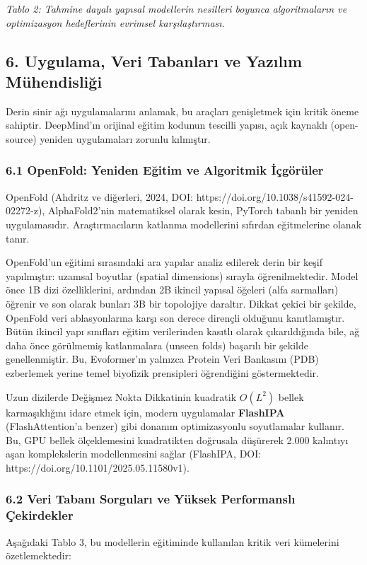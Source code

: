 \documentclass[11pt,a4paper]{article}
\begin{document}
\textit{Tablo 2: Tahmine dayalı yapısal modellerin nesilleri boyunca algoritmaların ve optimizasyon hedeflerinin evrimsel karşılaştırması.}

\subsection{6. Uygulama, Veri Tabanları ve Yazılım Mühendisliği}
Derin sinir ağı uygulamalarını anlamak, bu araçları genişletmek için kritik öneme sahiptir. DeepMind'ın orijinal eğitim kodunun tescilli yapısı, açık kaynaklı (open-source) yeniden uygulamaları zorunlu kılmıştır.

\subsubsection{6.1 OpenFold: Yeniden Eğitim ve Algoritmik İçgörüler}
OpenFold (Ahdritz ve diğerleri, 2024, DOI: https://doi.org/10.1038/s41592-024-02272-z), AlphaFold2'nin matematiksel olarak kesin, PyTorch tabanlı bir yeniden uygulamasıdır. Araştırmacıların katlanma modellerini sıfırdan eğitmelerine olanak tanır.

OpenFold'un eğitimi sırasındaki ara yapılar analiz edilerek derin bir keşif yapılmıştır: uzamsal boyutlar (spatial dimensions) sırayla öğrenilmektedir. Model önce 1B dizi özelliklerini, ardından 2B ikincil yapısal öğeleri (alfa sarmalları) öğrenir ve son olarak bunları 3B bir topolojiye daraltır. Dikkat çekici bir şekilde, OpenFold veri ablasyonlarına karşı son derece dirençli olduğunu kanıtlamıştır. Bütün ikincil yapı sınıfları eğitim verilerinden kasıtlı olarak çıkarıldığında bile, ağ daha önce görülmemiş katlanmalara (unseen folds) başarılı bir şekilde genellenmiştir. Bu, Evoformer'ın yalnızca Protein Veri Bankasını (PDB) ezberlemek yerine temel biyofizik prensipleri öğrendiğini göstermektedir.

Uzun dizilerde Değişmez Nokta Dikkatinin kuadratik \(O(L^2)\) bellek karmaşıklığını idare etmek için, modern uygulamalar \textbf{FlashIPA} (FlashAttention'a benzer) gibi donanım optimizasyonlu soyutlamalar kullanır. Bu, GPU bellek ölçeklemesini kuadratikten doğrusala düşürerek 2.000 kalıntıyı aşan komplekslerin modellenmesini sağlar (FlashIPA, DOI: https://doi.org/10.1101/2025.05.11580v1).

\subsubsection{6.2 Veri Tabanı Sorguları ve Yüksek Performanslı Çekirdekler}
Aşağıdaki Tablo 3, bu modellerin eğitiminde kullanılan kritik veri kümelerini özetlemektedir:
\end{document}
